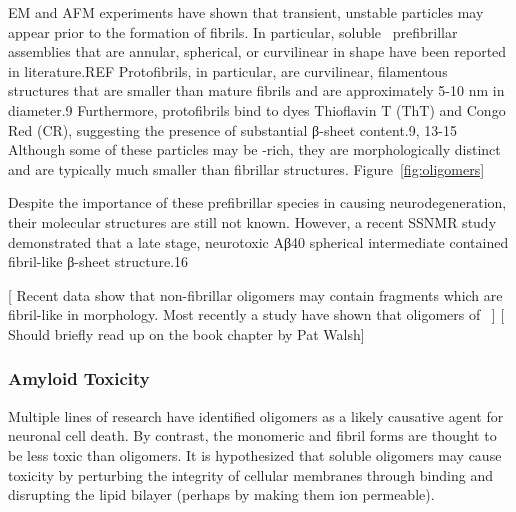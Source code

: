 EM and AFM experiments have shown that transient, unstable particles may appear prior to the formation of fibrils. In particular, soluble \abeta\ prefibrillar assemblies that are annular, spherical, or curvilinear in shape have been reported in literature.REF Protofibrils, in particular, are curvilinear, filamentous structures that are smaller than mature fibrils and are approximately 5-10 nm in diameter.9 Furthermore, protofibrils bind to dyes Thioflavin T (ThT) and Congo Red (CR), suggesting the presence of substantial β-sheet content.9, 13-15 Although some of these particles may be \bsheet-rich, they are morphologically distinct and are typically much smaller than fibrillar structures. Figure~\ref{fig:oligomers}

Despite the importance of these prefibrillar species in causing neurodegeneration, their molecular structures are still not known. However, a recent SSNMR study demonstrated that a late stage, neurotoxic Aβ40 spherical intermediate contained fibril-like β-sheet structure.16

[ Recent data show that non-fibrillar oligomers may contain fragments which are fibril-like in morphology. Most recently a study have shown that oligomers of \abeta\ ]
[ Should briefly read up on the book chapter by Pat Walsh]

\subsubsection{Amyloid Toxicity}

Multiple lines of research have identified oligomers as a likely causative agent for neuronal cell death. By contrast, the monomeric and fibril forms are thought to be less toxic than oligomers. It is hypothesized that soluble oligomers may cause toxicity by perturbing the integrity of cellular membranes through binding and disrupting the lipid bilayer (perhaps by making them ion permeable). \cite{Walsh:2007fu}




